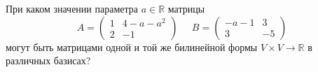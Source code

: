 \documentclass{article}
\begin{document}
При каком значении параметра $a \in \mathbb{R}$ матрицы
$$A = \left( \begin{array}{cc} 1& 4-a-a^2\\ 2&-1 \end{array} \right) \;\;\;\;\; B = \left( \begin{array}{cc} -a-1& 3\\ 3&-5 \end{array} \right)$$
могут быть матрицами одной и той же билинейной формы $V \times V \to \mathbb{R}$ в различных базисах?
\end{document}
